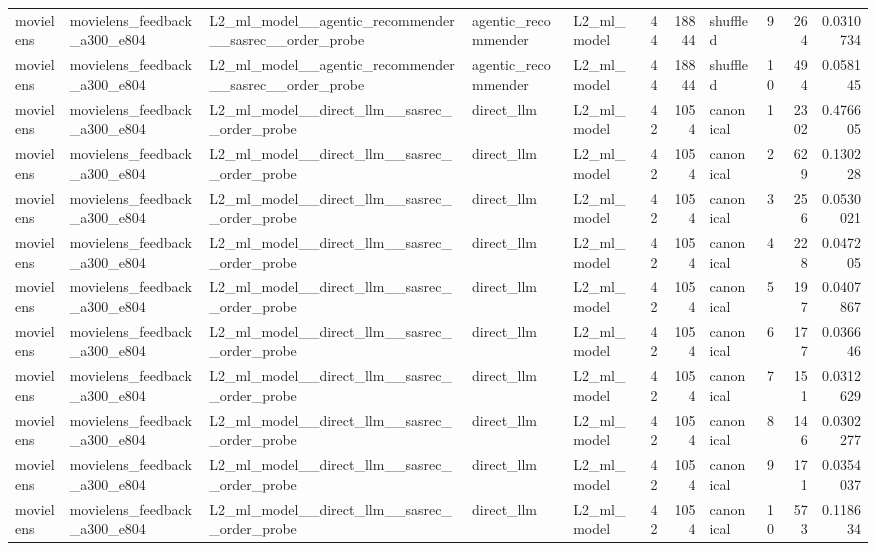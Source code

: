 \begin{table}[htbp!]
\begin{tabular}{lllllrrlrrr}
movielens & movielens\_feedback\_a300\_e804 & L2\_ml\_model\_\_agentic\_recommender\_\_sasrec\_\_order\_probe & agentic\_recommender & L2\_ml\_model & 44 & 18844 & shuffled & 9 & 264 & 0.0310734 \\
movielens & movielens\_feedback\_a300\_e804 & L2\_ml\_model\_\_agentic\_recommender\_\_sasrec\_\_order\_probe & agentic\_recommender & L2\_ml\_model & 44 & 18844 & shuffled & 10 & 494 & 0.058145 \\
movielens & movielens\_feedback\_a300\_e804 & L2\_ml\_model\_\_direct\_llm\_\_sasrec\_\_order\_probe & direct\_llm & L2\_ml\_model & 42 & 1054 & canonical & 1 & 2302 & 0.476605 \\
movielens & movielens\_feedback\_a300\_e804 & L2\_ml\_model\_\_direct\_llm\_\_sasrec\_\_order\_probe & direct\_llm & L2\_ml\_model & 42 & 1054 & canonical & 2 & 629 & 0.130228 \\
movielens & movielens\_feedback\_a300\_e804 & L2\_ml\_model\_\_direct\_llm\_\_sasrec\_\_order\_probe & direct\_llm & L2\_ml\_model & 42 & 1054 & canonical & 3 & 256 & 0.0530021 \\
movielens & movielens\_feedback\_a300\_e804 & L2\_ml\_model\_\_direct\_llm\_\_sasrec\_\_order\_probe & direct\_llm & L2\_ml\_model & 42 & 1054 & canonical & 4 & 228 & 0.047205 \\
movielens & movielens\_feedback\_a300\_e804 & L2\_ml\_model\_\_direct\_llm\_\_sasrec\_\_order\_probe & direct\_llm & L2\_ml\_model & 42 & 1054 & canonical & 5 & 197 & 0.0407867 \\
movielens & movielens\_feedback\_a300\_e804 & L2\_ml\_model\_\_direct\_llm\_\_sasrec\_\_order\_probe & direct\_llm & L2\_ml\_model & 42 & 1054 & canonical & 6 & 177 & 0.036646 \\
movielens & movielens\_feedback\_a300\_e804 & L2\_ml\_model\_\_direct\_llm\_\_sasrec\_\_order\_probe & direct\_llm & L2\_ml\_model & 42 & 1054 & canonical & 7 & 151 & 0.0312629 \\
movielens & movielens\_feedback\_a300\_e804 & L2\_ml\_model\_\_direct\_llm\_\_sasrec\_\_order\_probe & direct\_llm & L2\_ml\_model & 42 & 1054 & canonical & 8 & 146 & 0.0302277 \\
movielens & movielens\_feedback\_a300\_e804 & L2\_ml\_model\_\_direct\_llm\_\_sasrec\_\_order\_probe & direct\_llm & L2\_ml\_model & 42 & 1054 & canonical & 9 & 171 & 0.0354037 \\
movielens & movielens\_feedback\_a300\_e804 & L2\_ml\_model\_\_direct\_llm\_\_sasrec\_\_order\_probe & direct\_llm & L2\_ml\_model & 42 & 1054 & canonical & 10 & 573 & 0.118634 \\

\end{tabular}
\end{table}
